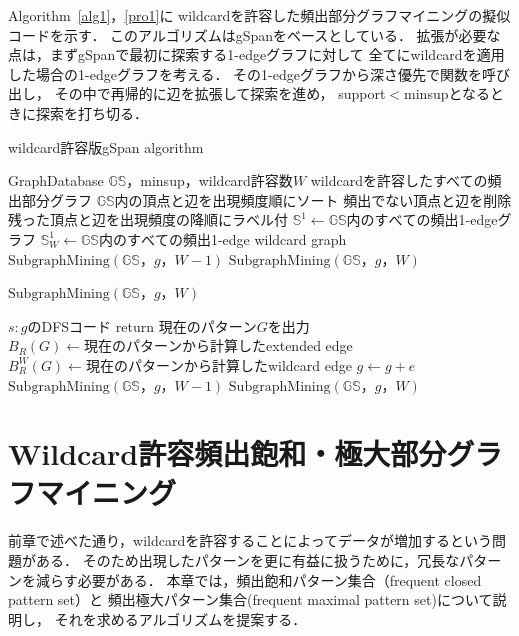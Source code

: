 \documentclass[12pt,fleqn]{jsotsuron}
\begin{document}
Algorithm~\ref{alg1}，\ref{pro1}に
wildcardを許容した頻出部分グラフマイニングの擬似コードを示す．
このアルゴリズムはgSpanをベースとしている．
拡張が必要な点は，まずgSpanで最初に探索する1-edgeグラフに対して
全てにwildcardを適用した場合の1-edgeグラフを考える．
その1-edgeグラフから深さ優先で関数を呼び出し，
その中で再帰的に辺を拡張して探索を進め，
support$<$minsupとなるときに探索を打ち切る．
\begin{algorithm} [t]
\caption{wildcard許容版gSpan algorithm}         
\label{alg1}                          
\begin{algorithmic} [1] 
\REQUIRE GraphDatabase $\mathbb{GS}$，minsup，wildcard許容数$W$
\ENSURE wildcardを許容したすべての頻出部分グラフ
\STATE $\mathbb{GS}内の頂点と辺を出現頻度順にソート$
\STATE $頻出でない頂点と辺を削除$
\STATE $残った頂点と辺を出現頻度の降順にラベル付$
\STATE $\mathbb{S}^1\leftarrow\mathbb{GS}内のすべての頻出$1-edgeグラフ
\STATE $\mathbb{S}^1_W\leftarrow\mathbb{GS}内のすべての頻出$1-edge wildcard graph
\STATE $\mathrm{SubgraphMining}(\mathbb{GS}，g，W-1)$
\STATE $\mathrm{SubgraphMining}(\mathbb{GS}，g，W)$
\ENDIF
\ENDFOR
\end{algorithmic}
\end{algorithm}
\begin{algorithm}[t] 
\caption{$\mathrm{SubgraphMining}(\mathbb{GS}，g，W)$}         
\label{pro1}                          
\begin{algorithmic} [1] 
\STATE $s:g$のDFSコード
\STATE return
\ENDIF
\STATE $現在のパターンGを出力$
\STATE $B_R(G)\leftarrow 現在のパターンから計算した$extended edge
\STATE $B^W_R(G)\leftarrow 現在のパターンから計算した$wildcard edge
\ENDIF
{}
\STATE $g \leftarrow g+e$
\STATE $\mathrm{SubgraphMining}(\mathbb{GS}，g，W-1)$
\STATE $\mathrm{SubgraphMining}(\mathbb{GS}，g，W)$
\ENDIF
\ENDIF
\ENDFOR
\end{algorithmic}
\end{algorithm}
\chapter{Wildcard許容頻出飽和・極大部分グラフマイニング}

前章で述べた通り，wildcardを許容することによってデータが増加するという問題がある．
そのため出現したパターンを更に有益に扱うために，冗長なパターンを減らす必要がある．
本章では，頻出飽和パターン集合（frequent closed pattern set）と
頻出極大パターン集合(frequent maximal pattern set)について説明し，
それを求めるアルゴリズムを提案する．
\end{document}
